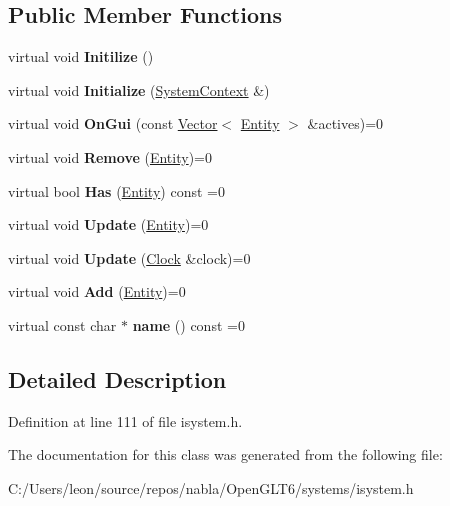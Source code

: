 \subsection*{Public Member Functions}
\begin{DoxyCompactItemize}
\item 
\mbox{\label{classnabla_1_1_i_system_a1ee1df133a03702150010b7129ff7f13}} 
virtual void {\bfseries Initilize} ()
\item 
\mbox{\label{classnabla_1_1_i_system_afc65d8bf5e5d52629c6cde26e67559a9}} 
virtual void {\bfseries Initialize} (\mbox{\hyperlink{structnabla_1_1_system_context}{System\+Context}} \&)
\item 
\mbox{\label{classnabla_1_1_i_system_ab596f72097bec121712ac1606ec2e1b9}} 
virtual void {\bfseries On\+Gui} (const \mbox{\hyperlink{classnabla_1_1_s_t_l_vector_ex}{Vector}}$<$ \mbox{\hyperlink{structnabla_1_1_entity}{Entity}} $>$ \&actives)=0
\item 
\mbox{\label{classnabla_1_1_i_system_aa1a5bd6e0d92bb49250ae409915a8ad8}} 
virtual void {\bfseries Remove} (\mbox{\hyperlink{structnabla_1_1_entity}{Entity}})=0
\item 
\mbox{\label{classnabla_1_1_i_system_a80d1d406a80d1739f91cf5254567de4d}} 
virtual bool {\bfseries Has} (\mbox{\hyperlink{structnabla_1_1_entity}{Entity}}) const =0
\item 
\mbox{\label{classnabla_1_1_i_system_a39deae13ca061a2c29d0b862db57ce6f}} 
virtual void {\bfseries Update} (\mbox{\hyperlink{structnabla_1_1_entity}{Entity}})=0
\item 
\mbox{\label{classnabla_1_1_i_system_a8c53489afe6c8cdb03c0cbf8a4faa4aa}} 
virtual void {\bfseries Update} (\mbox{\hyperlink{classnabla_1_1_clock}{Clock}} \&clock)=0
\item 
\mbox{\label{classnabla_1_1_i_system_a04bfe14ef6ae25d6ab87b688d561b98f}} 
virtual void {\bfseries Add} (\mbox{\hyperlink{structnabla_1_1_entity}{Entity}})=0
\item 
\mbox{\label{classnabla_1_1_i_system_a1d815359914c52292afa50157410ef85}} 
virtual const char $\ast$ {\bfseries name} () const =0
\end{DoxyCompactItemize}


\subsection{Detailed Description}


Definition at line 111 of file isystem.\+h.



The documentation for this class was generated from the following file\+:\begin{DoxyCompactItemize}
\item 
C\+:/\+Users/leon/source/repos/nabla/\+Open\+G\+L\+T6/systems/isystem.\+h\end{DoxyCompactItemize}
